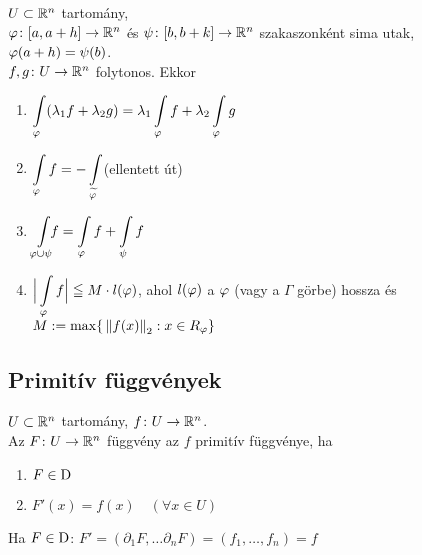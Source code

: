 \begin{te}
  $U\subset \mathbb{R}^n$ tartomány,\\$\varphi\colon [a,a+h]\to\mathbb{R}^n$ és $\psi\colon [b,b+k]\to\mathbb{R}^n$ szakaszonként sima utak,
  $\varphi(a+h) = \psi(b)$.\\$f,g\colon U\to\mathbb{R}^n$ folytonos. Ekkor
  \begin{enumerate}
  \item $\di\Int_\vfi(\lambda_1 f +\lambda_2g) = \lambda_1\Int_\vfi f+ \lambda_2\Int_\vfi g$
  \item $\di\Int_\vfi f = -\Int_{\widetilde{\vfi}}$\qquad (ellentett út)
  \item $\di\Int_{\vfi\cup\psi}\!\!\! f = \Int_\vfi f + \Int_\psi f$
  \item $\di\Big\vert \Int_\vfi f\Big\vert \leqq M\cdot l(\vfi)$, ahol $l(\varphi)$ a $\varphi$ (vagy a $\Gamma$ görbe)
  hossza és $M:= \max \{\,\left\Vert f(x)\right\Vert_2:x\in R_\varphi\}$
  \end{enumerate}
\end{te}

\subsection{Primitív függvények}
\begin{de}$U\subset\mathbb{R}^n$ tartomány, $f\colon U\to\mathbb{R}^n$.\\
  Az $F\colon U\to\mathbb{R}^n$ függvény az $f$ primitív függvénye, ha
  {\listazjromai
    \begin{enumerate}
    \item $F\in\operatorname{D}$
    \item $F'(x) = f(x)\quad (\forall x\in U)$
    \end{enumerate}
  }
\end{de}

\begin{megj}
  Ha $F\in\operatorname{D}$: $F'=(\partial_1F,\dotsc\partial_nF) =(f_1,\dotsc,f_n)=f$ 
\end{megj}


